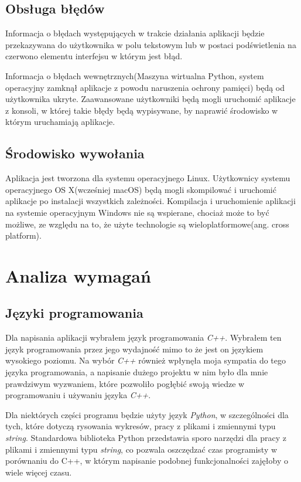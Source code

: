 \documentclass[paper=a4, fontsize=11pt]{scrartcl} %
\numberwithin{equation}{section} %
\numberwithin{figure}{section} %
\begin{document}
\subsection{Obsługa błędów}
    \par Informacja o błędach występujących w trakcie działania aplikacji będzie przekazywana
    do użytkownika w polu tekstowym lub w postaci podświetlenia na czerwono elementu interfejsu
    w którym jest błąd. 
    \par Informacja o błędach wewnętrznych(Maszyna wirtualna Python, system operacyjny zamknął
    aplikacje z powodu naruszenia ochrony pamięci) będą od użytkownika ukryte. Zaawansowane
    użytkowniki będą mogli uruchomić aplikacje z konsoli, w której takie błędy będą wypisywane,
    by naprawić środowisko w którym uruchamiają aplikacje.

\subsection{Środowisko wywołania}
    \par Aplikacja jest tworzona dla systemu operacyjnego Linux. Użytkownicy systemu operacyjnego
    OS X(wcześniej macOS) będą mogli skompilować i uruchomić aplikacje po instalacji wszystkich
    zależności. Kompilacja i uruchomienie aplikacji na systemie operacyjnym Windows nie są
    wspierane, chociaż może to być możliwe, ze względu na to, że użyte technologie są
    wieloplatformowe(ang. cross platform).

\newpage
\section{Analiza wymagań} %
\subsection{Języki programowania}
    \par Dla napisania aplikacji wybrałem język programowania \textit{C++}. Wybrałem ten język
    programowania przez jego wydajność mimo to że jest on językiem wysokiego poziomu. Na wybór
    \textit{C++} również wpłynęła moja sympatia do tego języka programowania, a napisanie
    dużego projektu w nim było dla mnie prawdziwym wyzwaniem, które pozwoliło pogłębić swoją
    wiedze w programowaniu i używaniu języka \textit{C++}. 

    \par Dla niektórych części programu będzie użyty język \textit{Python}, w szczególności dla
    tych, które dotyczą rysowania wykresów, pracy z plikami i zmiennymi typu \textit{string}.
    Standardowa biblioteka Python przedstawia sporo narzędzi dla pracy z plikami i zmiennymi
    typu \textit{string}, co pozwala oszczędzać czas programisty w porównaniu do C++, w którym
    napisanie podobnej funkcjonalności zajęłoby o wiele więcej czasu. 
\end{document}
